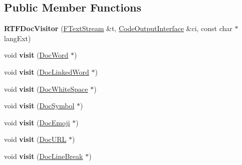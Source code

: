 \subsection*{Public Member Functions}
\begin{DoxyCompactItemize}
\item 
\mbox{\label{class_r_t_f_doc_visitor_ac948e2bbce6f318fd3cea2f3daacfc49}} 
{\bfseries R\+T\+F\+Doc\+Visitor} (\mbox{\hyperlink{class_f_text_stream}{F\+Text\+Stream}} \&t, \mbox{\hyperlink{class_code_output_interface}{Code\+Output\+Interface}} \&ci, const char $\ast$lang\+Ext)
\item 
\mbox{\label{class_r_t_f_doc_visitor_a9c5a705acc9d352e4666daa1701710cf}} 
void {\bfseries visit} (\mbox{\hyperlink{class_doc_word}{Doc\+Word}} $\ast$)
\item 
\mbox{\label{class_r_t_f_doc_visitor_a0adf23dfcfea19244e5096e4f978cb88}} 
void {\bfseries visit} (\mbox{\hyperlink{class_doc_linked_word}{Doc\+Linked\+Word}} $\ast$)
\item 
\mbox{\label{class_r_t_f_doc_visitor_a9cb724693e17eb256883a3cc567d100a}} 
void {\bfseries visit} (\mbox{\hyperlink{class_doc_white_space}{Doc\+White\+Space}} $\ast$)
\item 
\mbox{\label{class_r_t_f_doc_visitor_ae63f62e03aac6c5cc021c1d8b0dad55a}} 
void {\bfseries visit} (\mbox{\hyperlink{class_doc_symbol}{Doc\+Symbol}} $\ast$)
\item 
\mbox{\label{class_r_t_f_doc_visitor_a2f28811ad6507b3d58b37a55d0f92a7a}} 
void {\bfseries visit} (\mbox{\hyperlink{class_doc_emoji}{Doc\+Emoji}} $\ast$)
\item 
\mbox{\label{class_r_t_f_doc_visitor_a74f4684bde67054a187306373c87d4c7}} 
void {\bfseries visit} (\mbox{\hyperlink{class_doc_u_r_l}{Doc\+U\+RL}} $\ast$)
\item 
\mbox{\label{class_r_t_f_doc_visitor_ad17bfd3d4eeb330ec99dbf45dd9fb591}} 
void {\bfseries visit} (\mbox{\hyperlink{class_doc_line_break}{Doc\+Line\+Break}} $\ast$)
\item 

\end{DoxyCompactItemize}
